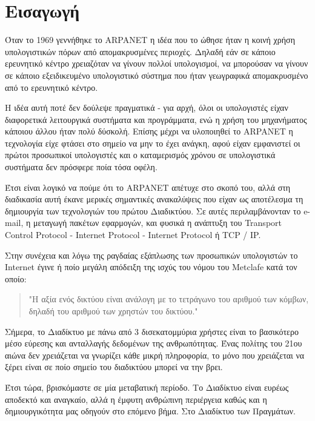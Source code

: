 \chapter{Εισαγωγή}\label{ch:intro}

Όταν το 1969 γεννήθηκε το ARPANET η ιδέα που το ώθησε  ήταν η κοινή χρήση υπολογιστικών πόρων από απομακρυσμένες περιοχές. Δηλαδή εάν σε κάποιο ερευνητικό κέντρο χρειαζόταν να γίνουν πολλοί υπολογισμοί, να μπορούσαν να γίνουν σε κάποιο εξειδικευμένο υπολογιστικό σύστημα που ήταν γεωγραφικά απομακρυσμένο από το ερευνητικό κέντρο.

H ιδέα αυτή ποτέ δεν δούλεψε πραγματικά - για αρχή, όλοι οι υπολογιστές είχαν διαφορετικά λειτουργικά συστήματα και προγράμματα, ενώ η χρήση του μηχανήματος κάποιου άλλου ήταν πολύ δύσκολή. Επίσης μέχρι να υλοποιηθεί το ARPANET η τεχνολογία είχε φτάσει στο σημείο να μην το έχει ανάγκη, αφού είχαν εμφανιστεί οι πρώτοι προσωπικοί υπολογιστές και ο καταμερισμός χρόνου σε υπολογιστικά συστήματα δεν πρόσφερε ποία τόσα οφέλη.

Έτσι είναι λογικό να πούμε ότι το ARPANET απέτυχε στο σκοπό του, αλλά στη διαδικασία αυτή έκανε μερικές σημαντικές ανακαλύψεις που είχαν ως αποτέλεσμα τη δημιουργία των τεχνολογιών του πρώτου Διαδικτύου. Σε αυτές περιλαμβάνονταν το e-mail, η μεταγωγή πακέτων εφαρμογών, και φυσικά η ανάπτυξη του Transport Control Protocol - Internet Protocol - Internet Protocol ή TCP / IP.

Στην συνέχεια και λόγω της ραγδαίας εξάπλωσης των προσωπικών υπολογιστών το Internet έγινε ή ποίο μεγάλη απόδειξη της ισχύς του νόμου του Metclafe κατά τον οποίο:\cite{Metclafe}
\begin{quotation}
"Η αξία ενός δικτύου είναι ανάλογη με το τετράγωνο του αριθμού των κόμβων, δηλαδή του αριθμού των χρηστών του δικτύου."
\end{quotation}

Σήμερα, το Διαδίκτυο με πάνω από 3 δισεκατομμύρια χρήστες είναι το βασικότερο μέσο 
εύρεσης και ανταλλαγής δεδομένων της ανθρωπότητας. Ένας πολίτης του 21ου αιώνα δεν χρειάζεται να γνωρίζει κάθε μικρή πληροφορία, το μόνο που χρειάζεται να ξέρει είναι σε ποίο σημείο του διαδικτύου μπορεί να την βρει. 

Έτσι τώρα, βρισκόμαστε σε μία μεταβατική περίοδο. Το Διαδίκτυο είναι ευρέως αποδεκτό και αναγκαίο, αλλά η έμφυτη ανθρώπινη περιέργεια καθώς και η δημιουργικότητα μας οδηγούν στο επόμενο βήμα. Στο Διαδίκτυο των Πραγμάτων.

